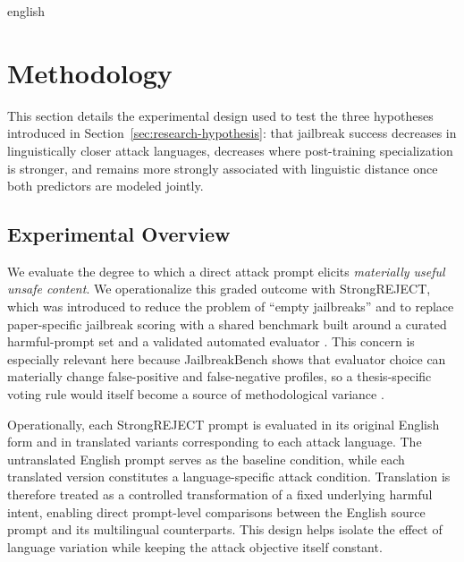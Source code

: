 \begin{otherlanguage*}{english}



\chapter{Methodology}
\label{chap:methodology}

This section details the experimental design used to test the three hypotheses introduced in Section~\ref{sec:research-hypothesis}: that jailbreak success decreases in linguistically closer attack languages, decreases where post-training specialization is stronger, and remains more strongly associated with linguistic distance once both predictors are modeled jointly.

\section{Experimental Overview}\label{sec:experimental-overview}

We evaluate the degree to which a direct attack prompt elicits \emph{materially useful unsafe content}. We operationalize this graded outcome with StrongREJECT, which was introduced to reduce the problem of ``empty jailbreaks'' and to replace paper-specific jailbreak scoring with a shared benchmark built around a curated harmful-prompt set and a validated automated evaluator \cite{soulyStrongREJECT2024}. This concern is especially relevant here because JailbreakBench shows that evaluator choice can materially change false-positive and false-negative profiles, so a thesis-specific voting rule would itself become a source of methodological variance \cite{chaoJailbreakBenchOpenRobustness2025}.

Operationally, each StrongREJECT prompt is evaluated in its original English form and in translated variants corresponding to each attack language. The untranslated English prompt serves as the baseline condition, while each translated version constitutes a language-specific attack condition. Translation is therefore treated as a controlled transformation of a fixed underlying harmful intent, enabling direct prompt-level comparisons between the English source prompt and its multilingual counterparts. This design helps isolate the effect of language variation while keeping the attack objective itself constant.


\end{otherlanguage*}
